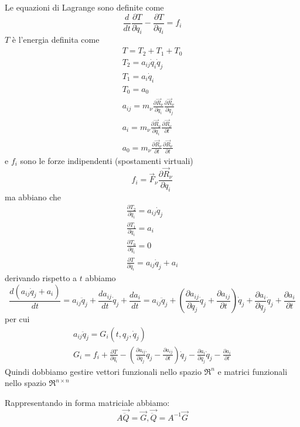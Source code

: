 \documentclass[a4paper,twoside]{article}
\begin{document}
\begin{enumerate}
Le equazioni di Lagrange sono definite come
\begin{equation}
\frac{d}{dt} \frac{\partial T}{\partial \dot q_i} - \frac{\partial T}{\partial q_i} = f_i
\end{equation}
$T$ è l'energia definita come
\begin{eqnarray}
T = T_2+T_1+T_0
\\
T_2 = a_{ij} \dot q_i \dot q_j
\\
T_1 =  a_i \dot q_i
\\
T_0 = a_0
\\
a_{ij} = m_\nu \frac{\partial \vec R_\nu}{\partial q_i} \frac{\partial \vec R_\nu}{\partial q_j}
\\
a_i  = m_\nu \frac{\partial \vec R_\nu}{\partial q_i} \frac{\partial \vec R_\nu}{\partial t}
\\
a_0  = m_\nu  \frac{\partial \vec R_\nu}{\partial t} \frac{\partial \vec R_\nu}{\partial t}
\end{eqnarray}
e $f_i$ sono le forze indipendenti (spostamenti virtuali)
\begin{equation}
f_i = \vec F_\nu \frac{\partial \vec R_\nu}{\partial q_i}
\end{equation}
ma abbiano che
\begin{eqnarray}
\frac{\partial T_2}{\partial \dot q_i}=a_{ij}\dot q_j
\\
\frac{\partial T_1}{\partial \dot q_i}=a_i
\\
\frac{\partial T_0}{\partial \dot q_i}=0
\\
\frac{\partial T}{\partial \dot q_i}=a_{ij}\dot q_j+a_i
\end{eqnarray}
derivando rispetto a $t$ abbiamo
\begin{equation}
\frac{d (a_{ij}\dot q_j+a_i)}{dt}
= a_{ij} \ddot q_j+\frac{d a_{ij}}{dt}\dot q_j+\frac{da_i}{dt}
= a_{ij} \ddot q_j+\left(\frac{\partial a_{ij}}{\partial q_j}\dot q_j+\frac{\partial a_{ij}}{\partial t}\right)\dot q_j+\frac{\partial a_i}{\partial q_j}\dot q_j+\frac{\partial a_i}{\partial t}
 \end{equation}
per cui
\begin{eqnarray}
a_{ij} \ddot q_j = G_i(t,q_j, \dot q_j)
\\
G_i=f_i+\frac{\partial T}{\partial q_i}-\left(\frac{\partial a_{ij}}{\partial q_j}\dot q_j-\frac{\partial a_{ij}}{\partial t}\right)\dot q_j-\frac{\partial a_i}{\partial q_j}\dot q_j-\frac{\partial a_i}{\partial t}
\end{eqnarray}
Quindi dobbiamo gestire vettori funzionali nello spazio $\Re^n$ e matrici funzionali nello spazio $\Re^{n \times n}$

Rappresentando in forma matriciale abbiamo:
\begin{equation}
A \vec {\ddot Q} = \vec G, \vec {\ddot Q} = A^{-1} \vec G
\end{equation}

\end{enumerate}
\end{document}
